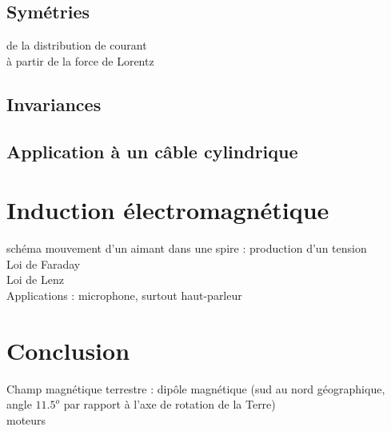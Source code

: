 \subsection{Symétries}
de la distribution de courant \\
à partir de la force de Lorentz \\
\subsection{Invariances}
\subsection{Application à un câble cylindrique}

\section{Induction électromagnétique}
schéma mouvement d'un aimant dans une spire : production d'un tension \\
Loi de Faraday \\
Loi de Lenz \\
Applications : microphone, surtout haut-parleur \\

\section*{Conclusion}
Champ magnétique terrestre : dipôle magnétique (sud au nord géographique, angle $11.5^o$ par rapport à l'axe de rotation de la Terre) \\
moteurs \\




